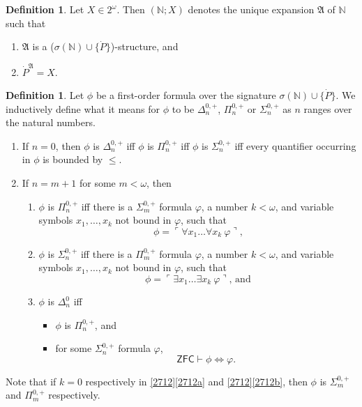 \documentclass[12pt, twoside]{memoir}
\numberwithin{equation}{section}
\theoremstyle{definition}
\newtheorem{defi}[thm]{Definition}
\theoremstyle{remark}
\theoremstyle{definition}
\theoremstyle{definition}
\theoremstyle{definition}
\theoremstyle{remark}
\begin{document}
\begin{defi}
Let $X \in 2^{\omega}$. Then $(\mathbb{N}; X)$ denotes the unique expansion $\mathfrak{A}$ of $\mathbb{N}$ such that
\begin{enumerate}[label=(\alph*)]
    \item $\mathfrak{A}$ is a ($\sigma(\mathbb{N}) \cup \{\dot{P}\}$)-structure, and
    \item $\dot{P}^{\mathfrak{A}}= X$.
\end{enumerate}
\end{defi}

\begin{defi}
Let $\phi$ be a first-order formula over the signature $\sigma(\mathbb{N}) \cup \{\dot{P}\}$. We inductively define what it means for $\phi$ to be $\Delta^{0,+}_n$, $\Pi^{0, +}_n$ or $\Sigma^{0, +}_n$ as $n$ ranges over the natural numbers.
\begin{enumerate}[label=(\arabic*)]
    \item If $n = 0$, then $\phi$ is $\Delta^{0, +}_n$ iff $\phi$ is $\Pi^{0, +}_n$ iff $\phi$ is $\Sigma^{0, +}_n$ iff every quantifier occurring in $\phi$ is bounded by $\leq$.
    \item If $n = m + 1$ for some $m < \omega$, then 
    \begin{enumerate}[label=(\alph*)]
        \item $\phi$ is $\Pi^{0, +}_n$ iff there is a $\Sigma^{0, +}_m$ formula $\varphi$, a number $k < \omega$, and variable symbols $x_1, \dots, x_k$ not bound in $\varphi$, such that 
        \begin{equation*}
            \phi = \ulcorner \forall x_1 \dots \forall x_k \ \varphi \urcorner \text{,}
        \end{equation*}
        \item $\phi$ is $\Sigma^{0, +}_n$ iff there is a $\Pi^{0, +}_m$ formula $\varphi$, a number $k < \omega$, and variable symbols $x_1, \dots, x_k$ not bound in $\varphi$, such that 
        \begin{equation*}
            \phi = \ulcorner \exists x_1 \dots \exists x_k \ \varphi \urcorner \text{, and}
        \end{equation*}
        \item $\phi$ is $\Delta^0_n$ iff 
        \begin{itemize}[label=$\circ$]
            \item $\phi$ is $\Pi^{0, +}_n$, and
            \item for some $\Sigma^{0, +}_n$ formula $\varphi$,
            \begin{equation*}
                \mathsf{ZFC} \vdash \phi \iff \varphi \text{.}
            \end{equation*}
        \end{itemize}
    \end{enumerate}
\end{enumerate}
Note that if $k = 0$ respectively in \ref{2712}\ref{2712a} and \ref{2712}\ref{2712b}, then $\phi$ is $\Sigma^{0, +}_m$ and $\Pi^{0, +}_m$ respectively.
\end{defi}
\end{document}
